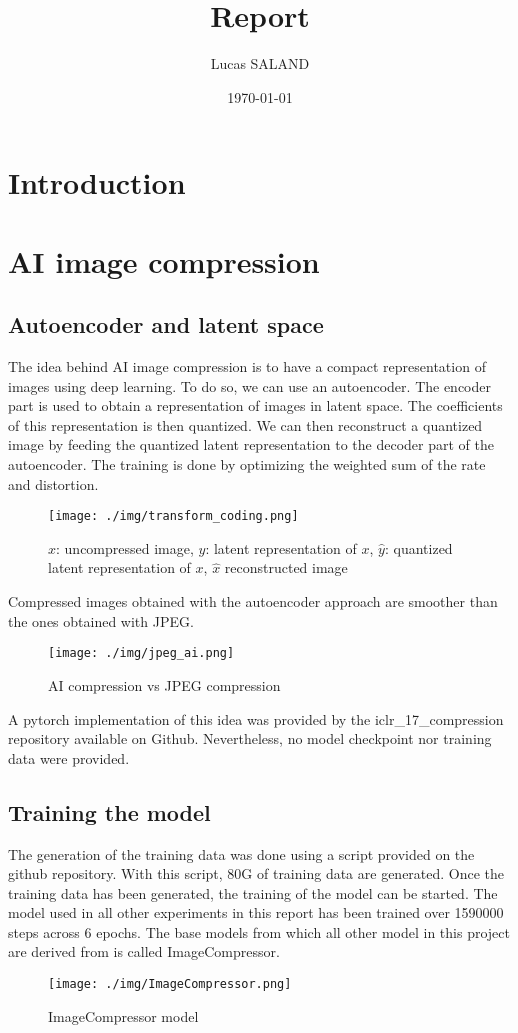 \documentclass[12pt]{article}
\title{Report}
\author{Lucas SALAND}
\date{\today}
\begin{document}
\section*{Introduction}

\section{AI image compression}
\subsection{Autoencoder and latent space}
The idea behind AI image compression is to have a compact representation of images using deep learning. To do so, we can use an autoencoder. The encoder part is used to obtain a representation of images in latent space. The coefficients of this representation is then quantized. We can then reconstruct a quantized image by feeding the quantized latent representation to the decoder part of the autoencoder. The training is done by optimizing the weighted sum of the rate and distortion.
\begin{figure}[H]
    \centering
    \texttt{[image: ./img/transform\_coding.png]}
    \caption[short]{$x$: uncompressed image, $y$: latent representation of $x$, $\hat{y}$: quantized latent representation of $x$, $\hat{x}$ reconstructed image}
\end{figure}
Compressed images obtained with the autoencoder approach are smoother than the ones obtained with JPEG.
\begin{figure}
    \centering
    \texttt{[image: ./img/jpeg\_ai.png]}
    \caption[short]{AI compression vs JPEG compression}
\end{figure}

A pytorch implementation of this idea was provided by the iclr\_17\_compression repository available on Github. Nevertheless, no model checkpoint nor training data were provided.


\subsection{Training the model}
The generation of the training data was done using a script provided on the github repository. With this script, 80G of training data are generated. Once the training data has been generated, the training of the model can be started. The model used in all other experiments in this report has been trained over 1590000 steps across 6 epochs. The base models from which all other model in this project are derived from is called ImageCompressor.
\begin{figure}[H]
    \centering
    \texttt{[image: ./img/ImageCompressor.png]}
    \caption[short]{ImageCompressor model}
\end{figure}
\end{document}
